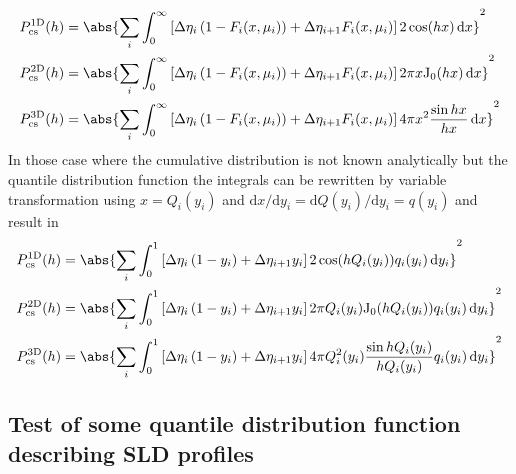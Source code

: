\begin{align}
  P_\textrm{cs}^\mathrm{1D}(h) & = \abs{\sum_i  \int_0^\infty \left[\Delta\eta_i\left(1-F_i(x,\mu_i)\right) +\Delta\eta_{i+1} F_i(x,\mu_i)\right] 2\cos (hx)\,\mathrm{d}x }^2 \\
  P_\textrm{cs}^\mathrm{2D}(h) & = \abs{\sum_i  \int_0^\infty \left[\Delta\eta_i\left(1-F_i(x,\mu_i)\right) +\Delta\eta_{i+1} F_i(x,\mu_i)\right] 2\pi x \textrm{J}_0(hx)\,\mathrm{d}x }^2 \\
  P_\textrm{cs}^\mathrm{3D}(h) & = \abs{\sum_i  \int_0^\infty \left[\Delta\eta_i\left(1-F_i(x,\mu_i)\right) +\Delta\eta_{i+1} F_i(x,\mu_i)\right] 4\pi x^2\frac{\sin hx}{hx}\,\mathrm{d}x }^2
\end{align}
In those case where the cumulative distribution is not known analytically but the quantile distribution function the integrals can be rewritten by variable transformation using $x=Q_i(y_i)$ and $\mathrm{d}x/\mathrm{d}y_i=\mathrm{d}Q(y_i)/\mathrm{d}y_i=q(y_i)$ and result in
\begin{align}
  P_\textrm{cs}^\mathrm{1D}(h) & = \abs{\sum_i  \int_0^1 \left[\Delta\eta_i\left(1-y_i\right) +\Delta\eta_{i+1} y_i\right] 2\cos (hQ_i(y_i))q_i(y_i)\,\mathrm{d}y_i }^2 \\
  P_\textrm{cs}^\mathrm{2D}(h) & = \abs{\sum_i  \int_0^1 \left[\Delta\eta_i\left(1-y_i\right) +\Delta\eta_{i+1} y_i\right] 2\pi Q_i(y_i) \textrm{J}_0(hQ_i(y_i))q_i(y_i)\,\mathrm{d}y_i }^2 \\
  P_\textrm{cs}^\mathrm{3D}(h) & = \abs{\sum_i  \int_0^1 \left[\Delta\eta_i\left(1-y_i\right) +\Delta\eta_{i+1} y_i\right] 4\pi Q_i^2(y_i)\frac{\sin hQ_i(y_i)}{hQ_i(y_i)}q_i(y_i)\,\mathrm{d}y_i }^2
\end{align}


\subsection{Test of some quantile distribution function describing SLD profiles} 